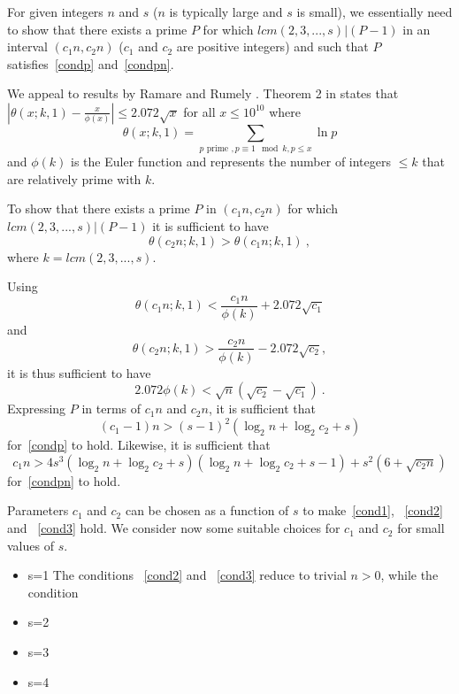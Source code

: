 For given integers $n$ and $s$ ($n$ is typically large and $s$ is
small), we essentially need to show that there exists a prime $P$
for which $lcm(2,3,...,s) | (P-1)$ in an interval $(c_1n,c_2n)$
($c_1$ and $c_2$ are positive integers) and such that $P$
satisfies~\eqref{condp} and~\eqref{condpn}.

We appeal to results by Ramare and Rumely \cite{rrumely}. Theorem
2 in \cite{rrumely} states that $|\theta(x;k,1)
-\frac{x}{\phi(x)}| \leq 2.072 \sqrt{x}$ for all $x \leq 10 ^{10}$
where \[\theta(x;k,1)=\sum_{p \text{ prime }, p \equiv 1 \mod k, p
\leq x} \ln p \] and $\phi(k)$ is the Euler function and
represents the number of integers $\leq k$ that are relatively
prime with $k$.

To show that there exists a prime $P$ in $(c_1n,c_2n)$ for which
$lcm(2,3,...,s) | (P-1)$  it is sufficient to have
\begin{equation} \theta(c_2n;k,1)> \theta(c_1n;k,1)~,\end{equation}
where $k=lcm(2,3,...,s)$.

Using \[\theta(c_1n;k,1) < \frac{c_1n}{\phi(k)}+2.072\sqrt{c_1}
\]
and \[\theta(c_2n;k,1) > \frac{c_2n}{\phi(k)}-2.072\sqrt{c_2},
\]it is thus sufficient to have
\begin{equation}\label{cond1}
2.072\phi(k) < \sqrt{n}(\sqrt{c_2}-\sqrt{c_1})~.
\end{equation}
Expressing $P$ in terms of $c_1n$ and $c_2n$, it is sufficient
that
\begin{equation}\label{cond2}
(c_1-1)n > (s-1)^2(\log_2n+\log_2c_2+s)
\end{equation}
for~\eqref{condp} to hold. Likewise, it is sufficient that
\begin{equation}\label{cond3}
c_1n>4s^3(\log_2n+\log_2c_2+s)(\log_2n+\log_2c_2+s-1)+s^2(6+\sqrt{c_2n})
\end{equation}
for~\eqref{condpn} to hold.

Parameters $c_1$ and $c_2$ can be chosen as a function of $s$ to
make~\eqref{cond1}, ~\eqref{cond2} and ~\eqref{cond3} hold. We
consider now some suitable choices for $c_1$ and $c_2$ for small
values of $s$.
\begin{itemize}
\item s=1 The conditions ~\eqref{cond2} and ~\eqref{cond3} reduce
to trivial $n>0$, while the condition \item s=2 \item s=3 \item
s=4 
\end{itemize}

